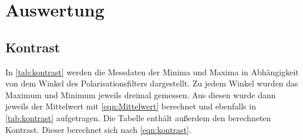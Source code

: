 \section{Auswertung}
\label{sec:Auswertung}



\subsection{Kontrast}
In \autoref{tab:kontrast} werden die Messdaten der Minima und Maxima in Abhängigkeit von dem Winkel des Polarisationsfilters dargestellt. 
Zu jedem Winkel wurden das Maximum und Minimum jeweils dreimal gemessen. Aus diesen wurde dann jeweils der Mittelwert mit \autoref{eqn:Mittelwert}
berechnet und ebenfalls in \autoref{tab:kontrast} aufgetragen. Die Tabelle enthält außerdem den berechneten Kontrast. Dieser berechnet sich nach 
\autoref{eqn:kontrast}.
